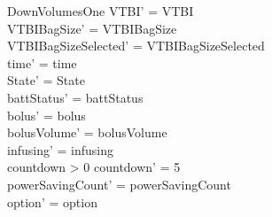 \begin{schema}{DownVolumesOne}
	VTBI' = VTBI\\
	VTBIBagSize' = VTBIBagSize\\ VTBIBagSizeSelected' = VTBIBagSizeSelected\\
	time' = time\\ State' = State\\
	battStatus' = battStatus\\
	bolus' = bolus\\
	bolusVolume' = bolusVolume\\
	infusing' = infusing\\
	countdown > 0 \land countdown' = 5\\
	\pagebreak 
	powerSavingCount' = powerSavingCount\\ 
	option' = option\\
\end{schema}

